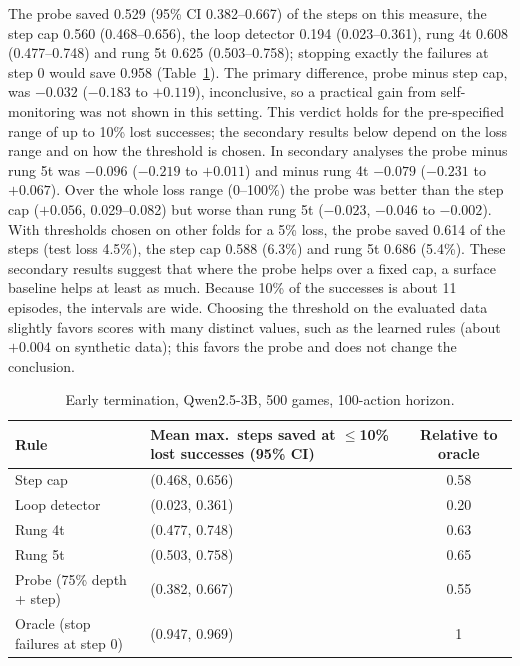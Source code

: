 \documentclass[11pt]{article}
\begin{document}
The probe saved 0.529 (95\% CI 0.382--0.667) of the steps on this measure, the step cap 0.560 (0.468--0.656), the loop detector 0.194 (0.023--0.361),
rung 4t 0.608 (0.477--0.748) and rung 5t 0.625 (0.503--0.758); stopping exactly the failures at step 0 would save 0.958 (Table~\ref{tab:early}).
The primary difference, probe minus step cap, was $-0.032$ ($-0.183$ to $+0.119$), inconclusive, so a practical gain from self-monitoring was not shown in this setting. This verdict holds for the pre-specified range of up to 10\% lost successes; the secondary results below depend on the loss range and on how the threshold is chosen.
In secondary analyses the probe minus rung 5t was $-0.096$ ($-0.219$ to $+0.011$) and minus rung 4t $-0.079$ ($-0.231$ to $+0.067$). Over the whole loss range (0--100\%)
the probe was better than the step cap ($+0.056$, 0.029--0.082) but worse than rung 5t ($-0.023$, $-0.046$ to $-0.002$). With thresholds chosen on other folds for a 5\% loss,
the probe saved 0.614 of the steps (test loss 4.5\%), the step cap 0.588 (6.3\%) and rung 5t 0.686 (5.4\%).
These secondary results suggest that where the probe helps over a fixed cap, a surface baseline helps at least as much. Because 10\% of the successes is about 11 episodes, the intervals are wide.
Choosing the threshold on the evaluated data slightly favors scores with many distinct values, such as the learned rules (about $+0.004$ on synthetic data); this favors the probe and does not change the conclusion.

\begin{table}[t]
\centering\small
\caption{Early termination, Qwen2.5-3B, 500 games, 100-action horizon.}\label{tab:early}
\begin{tabularx}{\linewidth}{@{}l>{\centering\arraybackslash}Xc@{}}
\toprule
Rule & Mean max.\ steps saved at $\le$10\% lost successes (95\% CI) & Relative to oracle \\
\midrule
Step cap & 0.560 (0.468, 0.656) & 0.58 \\
Loop detector & 0.194 (0.023, 0.361) & 0.20 \\
Rung 4t & 0.608 (0.477, 0.748) & 0.63 \\
Rung 5t & 0.625 (0.503, 0.758) & 0.65 \\
Probe (75\% depth + step) & 0.529 (0.382, 0.667) & 0.55 \\
Oracle (stop failures at step 0) & 0.958 (0.947, 0.969) & 1 \\
\bottomrule
\end{tabularx}
\end{table}
\end{document}
